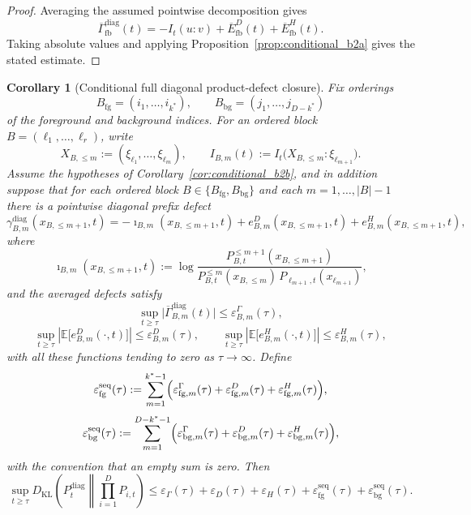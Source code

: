 \documentclass[12pt]{article}
\newtheorem{corollary}[theorem]{Corollary}
\theoremstyle{definition}
\theoremstyle{remark}
\begin{document}
\begin{proof}
Averaging the assumed pointwise decomposition gives
\[
\overline{\Gamma}_{\mathrm{fb}}^{\mathrm{diag}}(t)
=
-I_t(u:v)
+
\overline{E}_{\mathrm{fb}}^D(t)
+
\overline{E}_{\mathrm{fb}}^H(t).
\]
Taking absolute values and applying
Proposition~\ref{prop:conditional_b2a} gives the stated estimate.
\end{proof}

\begin{corollary}[Conditional full diagonal product-defect closure]\label{cor:conditional_full_prod}
Fix orderings
\[
B_{\mathrm{fg}}=(i_1,\dots,i_{k^*}),
\qquad
B_{\mathrm{bg}}=(j_1,\dots,j_{D-k^*})
\]
of the foreground and background indices. For an ordered block
\(B=(\ell_1,\dots,\ell_r)\), write
\[
X_{B,\le m}:=(\xi_{\ell_1},\dots,\xi_{\ell_m}),
\qquad
I_{B,m}(t):=I_t\!\bigl(X_{B,\le m}:\xi_{\ell_{m+1}}\bigr).
\]
Assume the hypotheses of Corollary~\ref{cor:conditional_b2b}, and in
addition suppose that for each ordered block
\(B\in\{B_{\mathrm{fg}},B_{\mathrm{bg}}\}\) and each
\(m=1,\dots,|B|-1\) there is a pointwise diagonal prefix defect
\[
\gamma_{B,m}^{\mathrm{diag}}(x_{B,\le m+1},t)
=
-\imath_{B,m}(x_{B,\le m+1},t)
+
e_{B,m}^D(x_{B,\le m+1},t)
+
e_{B,m}^H(x_{B,\le m+1},t),
\]
where
\[
\imath_{B,m}(x_{B,\le m+1},t)
:=
\log\frac{
P_{B,t}^{\le m+1}(x_{B,\le m+1})
}{
P_{B,t}^{\le m}(x_{B,\le m})\,P_{\ell_{m+1},t}(x_{\ell_{m+1}})
},
\]
and the averaged defects satisfy
\[
\sup_{t\ge\tau}
\bigl|
\overline{\Gamma}_{B,m}^{\mathrm{diag}}(t)
\bigr|
\le
\varepsilon_{B,m}^{\Gamma}(\tau),
\]
\[
\sup_{t\ge\tau}
\left|
\mathbb E\!\bigl[e_{B,m}^{D}(\cdot,t)\bigr]
\right|
\le
\varepsilon_{B,m}^{D}(\tau),
\qquad
\sup_{t\ge\tau}
\left|
\mathbb E\!\bigl[e_{B,m}^{H}(\cdot,t)\bigr]
\right|
\le
\varepsilon_{B,m}^{H}(\tau),
\]
with all these functions tending to zero as \(\tau\to\infty\). Define
\[
\varepsilon_{\mathrm{fg}}^{\mathrm{seq}}(\tau)
:=
\sum_{m=1}^{k^*-1}
\Bigl(
\varepsilon_{\mathrm{fg},m}^{\Gamma}(\tau)
+
\varepsilon_{\mathrm{fg},m}^{D}(\tau)
+
\varepsilon_{\mathrm{fg},m}^{H}(\tau)
\Bigr),
\]
\[
\varepsilon_{\mathrm{bg}}^{\mathrm{seq}}(\tau)
:=
\sum_{m=1}^{D-k^*-1}
\Bigl(
\varepsilon_{\mathrm{bg},m}^{\Gamma}(\tau)
+
\varepsilon_{\mathrm{bg},m}^{D}(\tau)
+
\varepsilon_{\mathrm{bg},m}^{H}(\tau)
\Bigr),
\]
with the convention that an empty sum is zero. Then
\[
\sup_{t\ge\tau}
D_{\mathrm{KL}}\!\left(
P_t^{\mathrm{diag}}
\middle\|
\prod_{i=1}^D P_{i,t}
\right)
\le
\varepsilon_\Gamma(\tau)
+
\varepsilon_D(\tau)
+
\varepsilon_H(\tau)
+
\varepsilon_{\mathrm{fg}}^{\mathrm{seq}}(\tau)
+
\varepsilon_{\mathrm{bg}}^{\mathrm{seq}}(\tau).
\]
\end{corollary}
\end{document}
